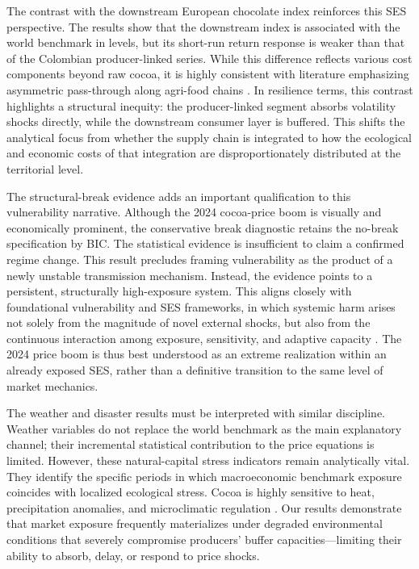 \documentclass[11pt]{article}
\begin{document}
The contrast with the downstream European chocolate index reinforces this SES perspective. The results show that the downstream index is associated with the world benchmark in levels, but its short-run return response is weaker than that of the Colombian producer-linked series. While this difference reflects various cost components beyond raw cocoa, it is highly consistent with literature emphasizing asymmetric pass-through along agri-food chains \citep{MeyerCramon2004,JimenezRodriguez2022}. In resilience terms, this contrast highlights a structural inequity: the producer-linked segment absorbs volatility shocks directly, while the downstream consumer layer is buffered. This shifts the analytical focus from whether the supply chain is integrated to how the ecological and economic costs of that integration are disproportionately distributed at the territorial level.

The structural-break evidence adds an important qualification to this vulnerability narrative. Although the 2024 cocoa-price boom is visually and economically prominent, the conservative break diagnostic retains the no-break specification by BIC. The statistical evidence is insufficient to claim a confirmed regime change. This result precludes framing vulnerability as the product of a newly unstable transmission mechanism. Instead, the evidence points to a persistent, structurally high-exposure system. This aligns closely with foundational vulnerability and SES frameworks, in which systemic harm arises not solely from the magnitude of novel external shocks, but also from the continuous interaction among exposure, sensitivity, and adaptive capacity \citep{Turner2003,Adger2006,Folke2006}. The 2024 price boom is thus best understood as an extreme realization within an already exposed SES, rather than a definitive transition to the same level of market mechanics.

The weather and disaster results must be interpreted with similar discipline. Weather variables do not replace the world benchmark as the main explanatory channel; their incremental statistical contribution to the price equations is limited. However, these natural-capital stress indicators remain analytically vital. They identify the specific periods in which macroeconomic benchmark exposure coincides with localized ecological stress. Cocoa is highly sensitive to heat, precipitation anomalies, and microclimatic regulation \citep{Schroth2016,Lahive2019,Niether2020,talero_sarmiento_etal_2025}. Our results demonstrate that market exposure frequently materializes under degraded environmental conditions that severely compromise producers' buffer capacities—limiting their ability to absorb, delay, or respond to price shocks. 
\end{document}
